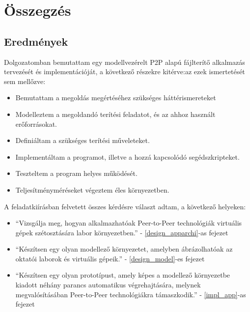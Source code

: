 \chapter{Összegzés}
\label{chp:summary}

\section{Eredmények}
 
 
Dolgozatomban bemutattam egy modellvezérelt P2P alapú fájlterítő alkalmazás tervezését és implementációját, a következő részekre kitérve:az ezek  ismertetését sem mellőzve:

\begin{itemize}
  \item Bemutattam a megoldás megértéséhez szükséges háttérismereteket
  \item Modelleztem a megoldandó terítési feladatot, és az ahhoz használt erőforrásokat.
  \item Definiáltam a szükséges terítési műveleteket.
  \item Implementáltam a programot, illetve a hozzá kapcsolódó segédszkripteket.
  \item Teszteltem a program helyes működését.
  \item Teljesítményméréseket végeztem éles környezetben.
\end{itemize}

A feladatkiírásban felvetett összes kérdésre választ adtam, a következő helyeken:

\begin{itemize}
  \item ``Vizsgálja  meg,  hogyan  alkalmazhatóak  Peer-to-Peer  technológiák  virtuális  gépek 
szétosztására labor környezetben.'' - \ref{design_apparchi}-as fejezet
  \item ``Készítsen  egy  olyan  modellező  környezetet,  amelyben  ábrázolhatóak  az  oktatói 
laborok és virtuális gépeik.'' - \ref{design_model}-es fejezet
  \item ``Készítsen egy olyan prototípust, amely képes a modellező környezetbe kiadott  néhány
parancs  automatikus  végrehajtására,  melynek  megvalósításában  Peer-to-Peer 
technológiákra támaszkodik.'' - \ref{impl_app}-as fejezet
\end{itemize}


